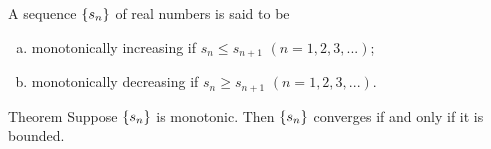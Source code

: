 \begin{mydef}
    \label{mydef:3.13}
    A sequence $\protect\{s_n\}$ of real numbers is said to be
    \begin{enumerate}[(a)]
        \item monotonically increasing if $s_n \leq s_{n+1}$ $(n=1,2,3,...)$;
        \item monotonically decreasing if $s_n \geq s_{n+1}$ $(n=1,2,3,...)$.
    \end{enumerate}
\end{mydef}

\begin{thm}
    \label{thm:3.14}
    Theorem Suppose $\protect\{s_n\}$ is monotonic. Then $\protect\{s_n\}$ converges if and only if it is bounded.
\end{thm}
